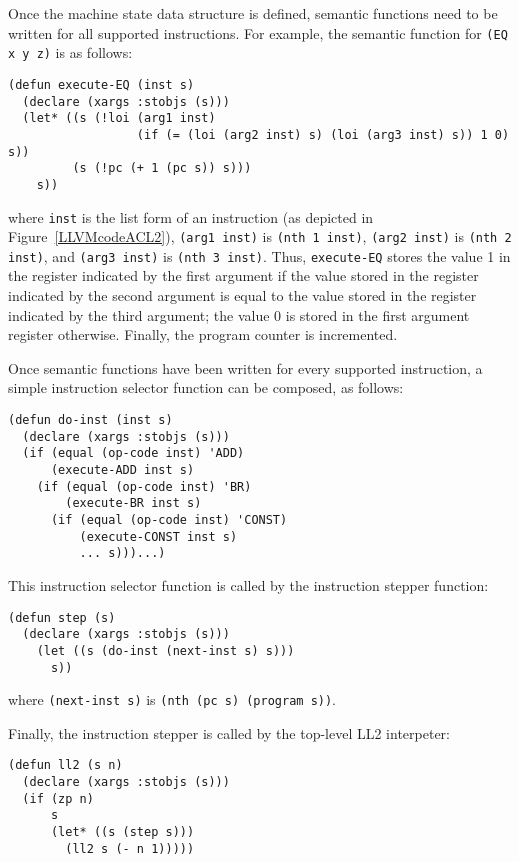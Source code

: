 \documentclass{eptcs}
\begin{document}
Once the machine state data structure is defined, semantic functions 
need to be written for all supported instructions.  For example, the
semantic function for \texttt{(EQ x y z)} is as follows:

\begin{verbatim}
(defun execute-EQ (inst s)
  (declare (xargs :stobjs (s)))
  (let* ((s (!loi (arg1 inst)
                  (if (= (loi (arg2 inst) s) (loi (arg3 inst) s)) 1 0) s))
         (s (!pc (+ 1 (pc s)) s)))
    s))
\end{verbatim}

where \texttt{inst} is the list form of an instruction (as depicted in
Figure~\ref{LLVMcodeACL2}), \texttt{(arg1 inst)}
is \texttt{(nth 1 inst)},  
\texttt{(arg2 inst)} is \texttt{(nth 2 inst)}, and 
\texttt{(arg3 inst)} is \texttt{(nth 3 inst)}.  Thus,
\texttt{execute-EQ} stores the value 1 in the register indicated by the 
first argument if the value stored in the register indicated by 
the second argument is equal to the value stored in the register indicated by 
the third argument; the value 0 is stored in the first argument register
otherwise.  Finally, the program counter is incremented. 



Once semantic functions have been written for every supported instruction,
a simple instruction selector function can
be composed, as follows:

\begin{verbatim}
(defun do-inst (inst s)
  (declare (xargs :stobjs (s)))
  (if (equal (op-code inst) 'ADD)
      (execute-ADD inst s)
    (if (equal (op-code inst) 'BR)
        (execute-BR inst s)
      (if (equal (op-code inst) 'CONST)
          (execute-CONST inst s)
          ... s)))...)
\end{verbatim}

This instruction selector function is called by the instruction
stepper function:

\begin{verbatim}
(defun step (s)
  (declare (xargs :stobjs (s)))
    (let ((s (do-inst (next-inst s) s)))
      s))
\end{verbatim}

where \texttt{(next-inst s)} is \texttt{(nth (pc s) (program s))}.

Finally, the instruction stepper is called by the top-level LL2 interpeter:

\begin{verbatim}
(defun ll2 (s n)
  (declare (xargs :stobjs (s)))
  (if (zp n)
      s
      (let* ((s (step s)))
        (ll2 s (- n 1)))))
\end{verbatim}
\end{document}
